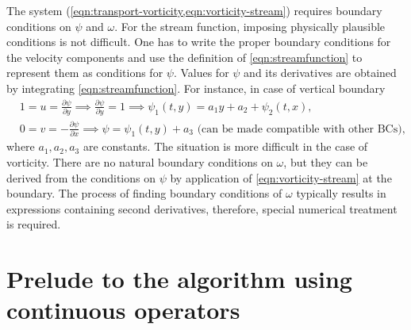 \documentclass{article}
\numberwithin{equation}{section}
\begin{document}
	The system (\cref{eqn:transport-vorticity,eqn:vorticity-stream}) requires boundary conditions on $\psi$ and $\omega$. 
		For the stream function, imposing physically plausible conditions is not difficult. 
		One has to write the proper boundary conditions for the velocity components and use the definition of \cref{eqn:streamfunction} to represent them as conditions for $\psi$. 
		Values for $\psi$ and its derivatives are obtained by integrating \cref{eqn:streamfunction}. For instance, in case of vertical boundary 
		\begin{align}
			&1=u=\frac{\partial\psi}{\partial y}\implies\frac{\partial\psi}{\partial y}=1\implies\psi_1(t,y)=a_1y+a_2+\psi_2(t,x),\\
			&0=v=-\frac{\partial\psi}{\partial x}\implies\psi=\psi_1(t,y)+a_3\text{ (can be made compatible with other BCs)},		
		\end{align}
		where $a_1,a_2,a_3$ are constants. The situation is more difficult in the case of vorticity. 
		There are no natural boundary conditions on $\omega$, but they can be derived from the conditions on $\psi$ by application of \cref{eqn:vorticity-stream} at the boundary. 
		The process of finding boundary conditions of $\omega$ typically results in expressions containing second derivatives, therefore, special numerical treatment is required.





\pagebreak
\section{Prelude to the algorithm using continuous operators}\label{sec:prelude-algorithm}
\end{document}
